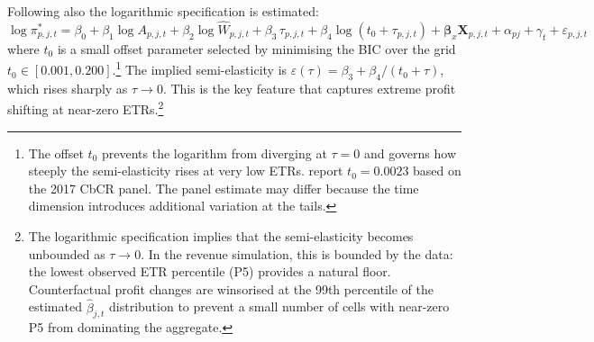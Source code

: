 \documentclass[11pt,a4paper]{article}
\begin{document}
Following \citet{garcia-bernardo2024} also the logarithmic specification is estimated:
\begin{equation}\label{eq:panel_log}
\log \pi_{p,j,t}^{*} = \beta_0 + \beta_1 \log A_{p,j,t} + \beta_2 \log \hat{W}_{p,j,t} + \beta_3 \, \tau_{p,j,t} + \beta_4 \log(t_0 + \tau_{p,j,t}) + \mathbf{\beta}_x \mathbf{X}_{p,j,t} + \alpha_{pj} + \gamma_t + \varepsilon_{p,j,t}
\end{equation}
where $t_0$ is a small offset parameter selected by minimising the BIC over the grid $t_0 \in [0.001, 0.200]$.\footnote{The offset $t_0$ prevents the logarithm from diverging at $\tau = 0$ and governs how steeply the semi-elasticity rises at very low ETRs. \citet{garcia-bernardo2024} report $t_0 = 0.0023$ based on the 2017 CbCR panel. The panel estimate may differ because the time dimension introduces additional variation at the tails.} The implied semi-elasticity is $\varepsilon(\tau) = \beta_3 + \beta_4 / (t_0 + \tau)$, which rises sharply as $\tau \to 0$. This is the key feature that captures extreme profit shifting at near-zero ETRs.\footnote{The logarithmic specification implies that the semi-elasticity becomes unbounded as $\tau \to 0$. In the revenue simulation, this is bounded by the data: the lowest observed ETR percentile (P5) provides a natural floor. Counterfactual profit changes are winsorised at the 99th percentile of the estimated $\hat{\beta}_{j,t}$ distribution to prevent a small number of cells with near-zero P5 from dominating the aggregate.}
\end{document}
